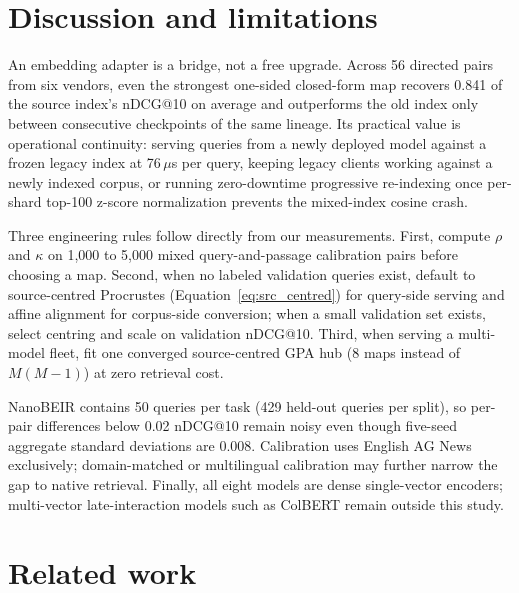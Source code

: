 \documentclass{article}
\begin{document}
\section{Discussion and limitations}

An embedding adapter is a bridge, not a free upgrade. Across 56 directed pairs from six vendors, even the strongest one-sided closed-form map recovers 0.841 of the source index's nDCG@10 on average and outperforms the old index only between consecutive checkpoints of the same lineage. Its practical value is operational continuity: serving queries from a newly deployed model against a frozen legacy index at 76\,$\mu$s per query, keeping legacy clients working against a newly indexed corpus, or running zero-downtime progressive re-indexing once per-shard top-100 z-score normalization prevents the mixed-index cosine crash.

Three engineering rules follow directly from our measurements. First, compute $\rho$ and $\kappa$ on 1{,}000 to 5{,}000 mixed query-and-passage calibration pairs before choosing a map. Second, when no labeled validation queries exist, default to source-centred Procrustes (Equation~\eqref{eq:src_centred}) for query-side serving and affine alignment for corpus-side conversion; when a small validation set exists, select centring and scale on validation nDCG@10. Third, when serving a multi-model fleet, fit one converged source-centred GPA hub (8 maps instead of $M(M-1)$) at zero retrieval cost.

NanoBEIR contains 50 queries per task (429 held-out queries per split), so per-pair differences below 0.02 nDCG@10 remain noisy even though five-seed aggregate standard deviations are 0.008. Calibration uses English AG News exclusively; domain-matched or multilingual calibration may further narrow the gap to native retrieval. Finally, all eight models are dense single-vector encoders; multi-vector late-interaction models such as ColBERT remain outside this study.

\section{Related work}
\end{document}
